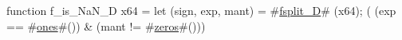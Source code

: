 function f_is_NaN_D   x64 = {
  let (sign, exp, mant) = #\hyperref[sailRISCVzfsplitzyD]{fsplit\_D}# (x64);
  (  (exp == #\hyperref[sailRISCVzones]{ones}#())
   & (mant != #\hyperref[sailRISCVzzzeros]{zeros}#()))
}
